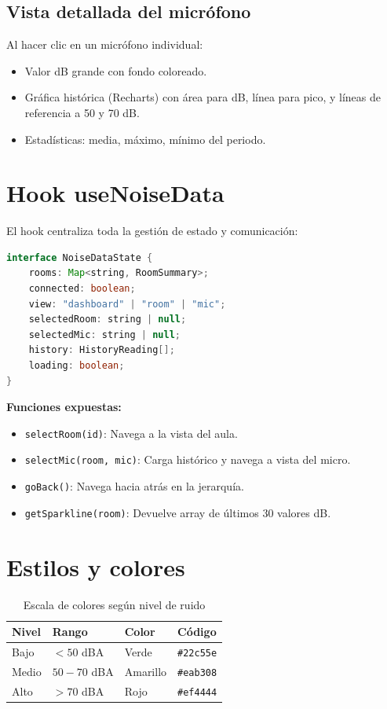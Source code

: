 \documentclass[12pt,a4paper]{report}
\begin{document}
\subsection{Vista detallada del micr\'ofono}

Al hacer clic en un micr\'ofono individual:

\begin{itemize}
    \item Valor dB grande con fondo coloreado.
    \item Gr\'afica hist\'orica (Recharts) con \'area para dB, l\'inea para pico, y l\'ineas de referencia a 50 y 70 dB.
    \item Estad\'isticas: media, m\'aximo, m\'inimo del periodo.
\end{itemize}

\section{Hook useNoiseData}

El hook centraliza toda la gesti\'on de estado y comunicaci\'on:

\begin{lstlisting}[language=Java, caption={Interfaz del estado (useNoiseData.ts)}]
interface NoiseDataState {
    rooms: Map<string, RoomSummary>;
    connected: boolean;
    view: "dashboard" | "room" | "mic";
    selectedRoom: string | null;
    selectedMic: string | null;
    history: HistoryReading[];
    loading: boolean;
}
\end{lstlisting}

\textbf{Funciones expuestas:}
\begin{itemize}
    \item \texttt{selectRoom(id)}: Navega a la vista del aula.
    \item \texttt{selectMic(room, mic)}: Carga hist\'orico y navega a vista del micro.
    \item \texttt{goBack()}: Navega hacia atr\'as en la jerarqu\'ia.
    \item \texttt{getSparkline(room)}: Devuelve array de \'ultimos 30 valores dB.
\end{itemize}

\section{Estilos y colores}

\begin{table}[H]
\centering
\begin{tabular}{llll}
\toprule
\textbf{Nivel} & \textbf{Rango} & \textbf{Color} & \textbf{C\'odigo} \\
\midrule
Bajo & $< 50$ dBA & \textcolor{dbgreen}{Verde} & \texttt{\#22c55e} \\
Medio & $50-70$ dBA & \textcolor{dbyellow}{Amarillo} & \texttt{\#eab308} \\
Alto & $> 70$ dBA & \textcolor{dbred}{Rojo} & \texttt{\#ef4444} \\
\bottomrule
\end{tabular}
\caption{Escala de colores seg\'un nivel de ruido}
\end{table}
\end{document}
